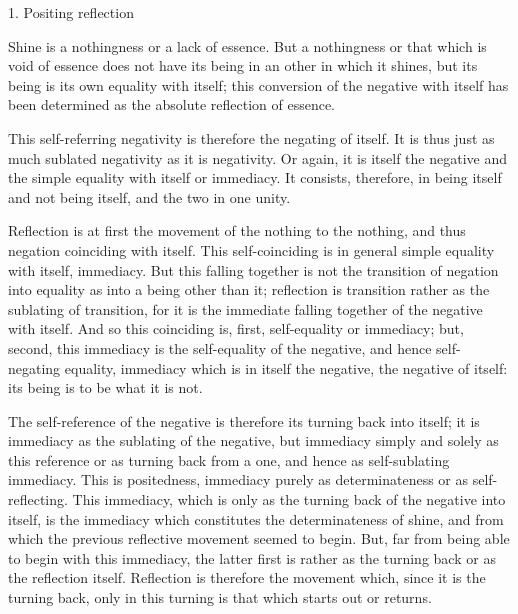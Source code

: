 1. Positing reflection

Shine is a nothingness or a lack of essence.
But a nothingness or that which is void of essence
does not have its being in an other in which it shines,
but its being is its own equality with itself;
this conversion of the negative with itself has been determined
as the absolute reflection of essence.

This self-referring negativity is
therefore the negating of itself.
It is thus just as much
sublated negativity as it is negativity.
Or again, it is itself the negative
and the simple equality with itself or immediacy.
It consists, therefore, in being itself
and not being itself,
and the two in one unity.

Reflection is at first the movement of
the nothing to the nothing,
and thus negation coinciding with itself.
This self-coinciding is in general
simple equality with itself, immediacy.
But this falling together is not
the transition of negation into equality
as into a being other than it;
reflection is transition rather
as the sublating of transition,
for it is the immediate falling together
of the negative with itself.
And so this coinciding is, first,
self-equality or immediacy;
but, second, this immediacy is
the self-equality of the negative,
and hence self-negating equality,
immediacy which is in itself the negative,
the negative of itself:
its being is to be what it is not.

The self-reference of the negative is
therefore its turning back into itself;
it is immediacy as the sublating of the negative,
but immediacy simply and solely as this reference
or as turning back from a one,
and hence as self-sublating immediacy.
This is positedness,
immediacy purely as determinateness
or as self-reflecting.
This immediacy, which is only as
the turning back of the negative into itself,
is the immediacy which constitutes the determinateness of shine,
and from which the previous reflective movement seemed to begin.
But, far from being able to begin with this immediacy,
the latter first is rather as the turning back
or as the reflection itself.
Reflection is therefore the movement which,
since it is the turning back,
only in this turning is that
which starts out or returns.

